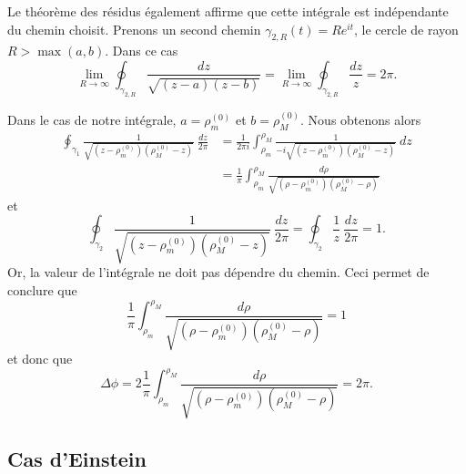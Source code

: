 \documentclass[a4paper,11pt]{report}
\theoremstyle{definition}
\theoremstyle{plain}
\theoremstyle{definition}
\theoremstyle{remark}
\begin{document}
            Le théorème des résidus également affirme que cette intégrale est indépendante du chemin choisit. Prenons un second chemin $\gamma_{2,R}(t) = Re^{it}$, le cercle de rayon $R>\max(a,b)$. Dans ce cas
            \begin{equation}
                \lim\limits_{R\to\infty} \oint_{\gamma_{2,R}}\frac{dz}{\sqrt{\left( z-a \right)\left( z-b \right)}} = \lim\limits_{R\to\infty}\oint_{\gamma_{2,R}}\frac{dz}{z} = 2\pi.
            \end{equation}
            
            Dans le cas de notre intégrale, $a = \rho^{(0)}_m$ et $b = \rho^{(0)}_M$. Nous obtenons alors
            \begin{align}
                \oint_{\gamma_1} \frac{1}{\sqrt{\left( z-\rho^{(0)}_m \right)\left( \rho^{(0)}_M-z \right)}}~\frac{dz}{2\pi} &= \frac{1}{2\pi i} \int^{\rho_M}_{\rho_m}\frac{1}{-i\sqrt{\left( z-\rho^{(0)}_m \right)\left( \rho^{(0)}_M-z \right)}}~dz\\
                &= \frac{1}{\pi} \int^{\rho_M}_{\rho_m}\frac{d\rho}{\sqrt{\left( \rho-\rho^{(0)}_m \right)\left( \rho^{(0)}_M-\rho \right)}}
            \end{align}
            et
            \begin{equation}
                \oint_{\gamma_2} \frac{1}{\sqrt{\left( z-\rho^{(0)}_m \right)\left( \rho^{(0)}_M-z \right)}}~\frac{dz}{2\pi} = \oint_{\gamma_2}\frac{1}{z}~\frac{dz}{2\pi} = 1.
            \end{equation}
            Or, la valeur de l'intégrale ne doit pas dépendre du chemin. Ceci permet de conclure que
            \begin{equation}
                \frac{1}{\pi} \int^{\rho_M}_{\rho_m}\frac{d\rho}{\sqrt{\left( \rho-\rho^{(0)}_m \right)\left( \rho^{(0)}_M-\rho \right)}} = 1
            \end{equation}
            et donc que
            \begin{equation}
                \Delta\phi = 2 \frac{1}{\pi} \int^{\rho_M}_{\rho_m}\frac{d\rho}{\sqrt{\left( \rho-\rho^{(0)}_m \right)\left( \rho^{(0)}_M-\rho \right)}} = 2\pi.
            \end{equation}
        
        \subsection{Cas d'Einstein}
        
\end{document}
